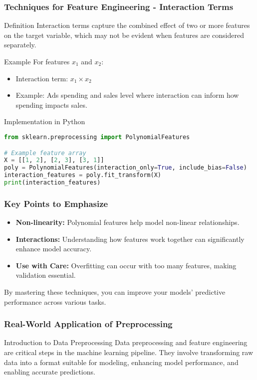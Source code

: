 \documentclass[aspectratio=169]{beamer}
\begin{document}
\begin{frame}[fragile]
    \frametitle{Techniques for Feature Engineering - Interaction Terms}
    \begin{block}{Definition}
        Interaction terms capture the combined effect of two or more features on the target variable, which may not be evident when features are considered separately.
    \end{block}
    
    \begin{block}{Example}
        For features \( x_1 \) and \( x_2 \):
        \begin{itemize}
            \item Interaction term: \( x_1 \times x_2 \)
            \item Example: Ads spending and sales level where interaction can inform how spending impacts sales.
        \end{itemize}
    \end{block}

    \begin{block}{Implementation in Python}
        \begin{lstlisting}[language=Python]
from sklearn.preprocessing import PolynomialFeatures

# Example feature array
X = [[1, 2], [2, 3], [3, 1]]
poly = PolynomialFeatures(interaction_only=True, include_bias=False)
interaction_features = poly.fit_transform(X)
print(interaction_features)
        \end{lstlisting}
    \end{block}
\end{frame}

\begin{frame}
    \frametitle{Key Points to Emphasize}
    \begin{itemize}
        \item \textbf{Non-linearity:} Polynomial features help model non-linear relationships.
        \item \textbf{Interactions:} Understanding how features work together can significantly enhance model accuracy.
        \item \textbf{Use with Care:} Overfitting can occur with too many features, making validation essential.
    \end{itemize}
    By mastering these techniques, you can improve your models' predictive performance across various tasks.
\end{frame}

\begin{frame}[fragile]
    \frametitle{Real-World Application of Preprocessing}
    \begin{block}{Introduction to Data Preprocessing}
        Data preprocessing and feature engineering are critical steps in the machine learning pipeline. They involve transforming raw data into a format suitable for modeling, enhancing model performance, and enabling accurate predictions.
    \end{block}
\end{frame}
\end{document}
